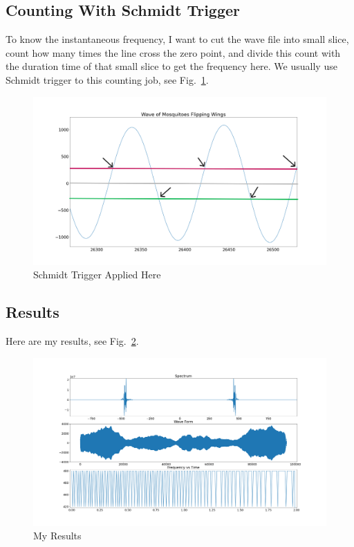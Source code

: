 \documentclass{article}
\begin{document}
\subsection{Counting With Schmidt Trigger}
To know the instantaneous frequency, I want to cut the wave file into small slice, count how many times the line cross the zero point, and divide this count with the duration time of that small slice to get the frequency here. We usually use Schmidt trigger to this counting job, see Fig.~\ref{fig:CountFlipping}.
\begin{figure}[!h]
	\centering
	\includegraphics[width=5 in]{../pic/CountFlipping.png}
	\caption{Schmidt Trigger Applied Here}
	\label{fig:CountFlipping}
\end{figure}

\subsection{Results}
Here are my results, see Fig.~\ref{fig:MosquitoResults}.
\begin{figure}[!h]
	\centering
	\includegraphics[width=5 in]{../pic/MosquitoResults.png}
	\caption{My Results}
	\label{fig:MosquitoResults}
\end{figure}
\end{document}
